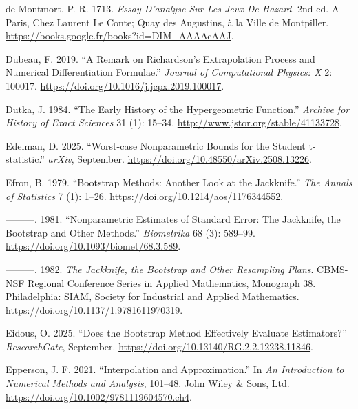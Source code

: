 \documentclass[
]{article}
\newlength{\cslhangindent}
\newlength{\cslentryspacingunit} %
\newenvironment{CSLReferences}[2] %
 {%
  \setlength{\parindent}{0pt}
  \ifodd #1
  \let\oldpar\par
  \def\par{\hangindent=\cslhangindent\oldpar}
  \fi
  \setlength{\parskip}{#2\cslentryspacingunit}
 }%
 {}
\begin{document}
\begin{CSLReferences}{1}{0}
\leavevmode{}%
de Montmort, P. R. 1713. \emph{{Essay D'analyse Sur Les Jeux De
Hazard}}. 2nd ed. {A Paris, Chez Laurent Le Conte; Quay des Augustins, à
la Ville de Montpiller}.
\url{https://books.google.fr/books?id=DIM_AAAAcAAJ}.

\leavevmode{}%
Dubeau, F. 2019. {``A Remark on Richardson's Extrapolation Process and
Numerical Differentiation Formulae.''} \emph{Journal of Computational
Physics: X} 2: 100017. \url{https://doi.org/10.1016/j.jcpx.2019.100017}.

\leavevmode{}%
Dutka, J. 1984. {``The Early History of the Hypergeometric Function.''}
\emph{Archive for History of Exact Sciences} 31 (1): 15--34.
\url{http://www.jstor.org/stable/41133728}.

\leavevmode{}%
Edelman, D. 2025. {``{Worst-case Nonparametric Bounds for the Student
t-statistic}.''} \emph{arXiv}, September.
\url{https://doi.org/10.48550/arXiv.2508.13226}.

\leavevmode{}%
Efron, B. 1979. {``{Bootstrap Methods: Another Look at the
Jackknife}.''} \emph{The Annals of Statistics} 7 (1): 1--26.
\url{https://doi.org/10.1214/aos/1176344552}.

\leavevmode{}%
---------. 1981. {``Nonparametric Estimates of Standard Error: The
Jackknife, the Bootstrap and Other Methods.''} \emph{Biometrika} 68 (3):
589--99. \url{https://doi.org/10.1093/biomet/68.3.589}.

\leavevmode{}%
---------. 1982. \emph{The Jackknife, the Bootstrap and Other Resampling
Plans}. CBMS-NSF Regional Conference Series in Applied Mathematics,
Monograph 38. Philadelphia: {SIAM, Society for Industrial and Applied
Mathematics}. \url{https://doi.org/10.1137/1.9781611970319}.

\leavevmode{}%
Eidous, O. 2025. {``Does the Bootstrap Method Effectively Evaluate
Estimators?''} \emph{{ResearchGate}}, September.
\url{https://doi.org/10.13140/RG.2.2.12238.11846}.

\leavevmode{}%
Epperson, J. F. 2021. {``Interpolation and Approximation.''} In \emph{An
Introduction to Numerical Methods and Analysis}, 101--48. John Wiley \&
Sons, Ltd. \url{https://doi.org/10.1002/9781119604570.ch4}.


\end{CSLReferences}
\end{document}

